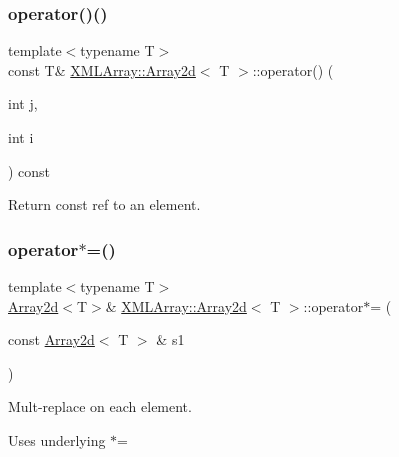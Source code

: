 \subsubsection{\texorpdfstring{operator()()}{operator()()}\hspace{0.1cm}{\footnotesize\ttfamily [6/6]}}
{\footnotesize\ttfamily template$<$typename T$>$ \\
const T\& \mbox{\hyperlink{classXMLArray_1_1Array2d}{X\+M\+L\+Array\+::\+Array2d}}$<$ T $>$\+::operator() (\begin{DoxyParamCaption}\item[{int}]{j,  }\item[{int}]{i }\end{DoxyParamCaption}) const\hspace{0.3cm}{\ttfamily [inline]}}



Return const ref to an element. 

\mbox{\label{classXMLArray_1_1Array2d_a591d1e6e7de9fd024657bb6e9264a89b}} 
\subsubsection{\texorpdfstring{operator$\ast$=()}{operator*=()}\hspace{0.1cm}{\footnotesize\ttfamily [1/6]}}
{\footnotesize\ttfamily template$<$typename T$>$ \\
\mbox{\hyperlink{classXMLArray_1_1Array2d}{Array2d}}$<$T$>$\& \mbox{\hyperlink{classXMLArray_1_1Array2d}{X\+M\+L\+Array\+::\+Array2d}}$<$ T $>$\+::operator$\ast$= (\begin{DoxyParamCaption}\item[{const \mbox{\hyperlink{classXMLArray_1_1Array2d}{Array2d}}$<$ T $>$ \&}]{s1 }\end{DoxyParamCaption})\hspace{0.3cm}{\ttfamily [inline]}}



Mult-\/replace on each element. 

Uses underlying $\ast$= \mbox{\label{classXMLArray_1_1Array2d_a591d1e6e7de9fd024657bb6e9264a89b}} 
